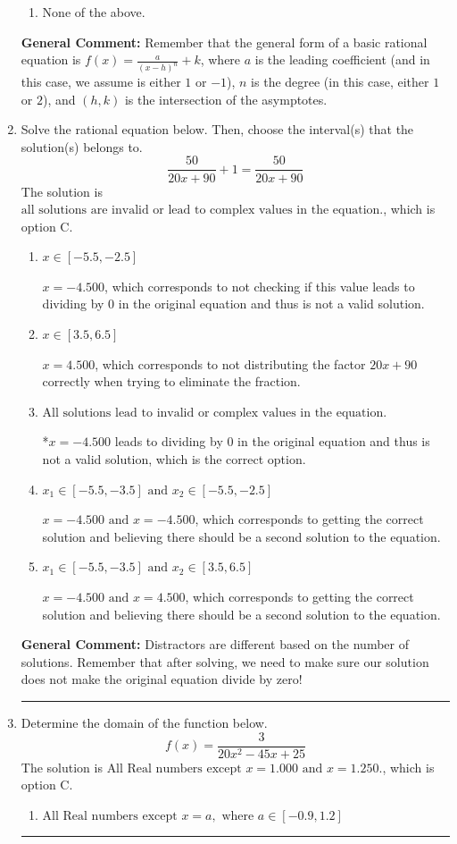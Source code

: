 \documentclass{extbook}[14pt]
\newcommand{\litem}[1]{\item #1

\rule{\textwidth}{0.4pt}}
\begin{document}
\begin{enumerate}
{\begin{enumerate}[label=\Alph*.]
\begin{multicols}{2}
\end{multicols}\item None of the above.\end{enumerate}
\textbf{General Comment:} Remember that the general form of a basic rational equation is $ f(x) = \frac{a}{(x-h)^n} + k$, where $a$ is the leading coefficient (and in this case, we assume is either $1$ or $-1$), $n$ is the degree (in this case, either $1$ or $2$), and $(h, k)$ is the intersection of the asymptotes.
}
\litem{
Solve the rational equation below. Then, choose the interval(s) that the solution(s) belongs to.
\[ \frac{50}{20x + 90} + 1 = \frac{50}{20x + 90} \]The solution is \( \text{all solutions are invalid or lead to complex values in the equation.} \), which is option C.\begin{enumerate}[label=\Alph*.]
\item \( x \in [-5.5,-2.5] \)

$x = -4.500$, which corresponds to not checking if this value leads to dividing by 0 in the original equation and thus is not a valid solution.
\item \( x \in [3.5,6.5] \)

$x = 4.500$, which corresponds to not distributing the factor $20x + 90$ correctly when trying to eliminate the fraction.
\item \( \text{All solutions lead to invalid or complex values in the equation.} \)

*$x = -4.500$ leads to dividing by 0 in the original equation and thus is not a valid solution, which is the correct option.
\item \( x_1 \in [-5.5, -3.5] \text{ and } x_2 \in [-5.5,-2.5] \)

$x = -4.500 \text{ and } x = -4.500$, which corresponds to getting the correct solution and believing there should be a second solution to the equation.
\item \( x_1 \in [-5.5, -3.5] \text{ and } x_2 \in [3.5,6.5] \)

$x = -4.500 \text{ and } x = 4.500$, which corresponds to getting the correct solution and believing there should be a second solution to the equation.
\end{enumerate}

\textbf{General Comment:} Distractors are different based on the number of solutions. Remember that after solving, we need to make sure our solution does not make the original equation divide by zero!
}
\litem{
Determine the domain of the function below.
\[ f(x) = \frac{3}{20x^{2} -45 x + 25} \]The solution is \( \text{All Real numbers except } x = 1.000 \text{ and } x = 1.250. \), which is option C.\begin{enumerate}[label=\Alph*.]
\item \( \text{All Real numbers except } x = a, \text{ where } a \in [-0.9, 1.2] \)


\end{enumerate}}
\end{enumerate}
\end{document}
